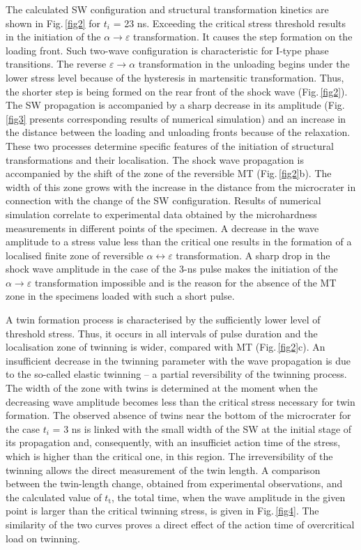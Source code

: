 \documentclass[sw,bibself]{svjour}
\begin{document}
The calculated  SW configuration and structural transformation kinetics
are shown in Fig.\,\ref{fig2} for $t_{i}$ = 23 ns.
Exceeding the critical stress
threshold results in the initiation of
the $\alpha \rightarrow \varepsilon$ transformation.
It causes the step formation on the loading front. Such two-wave configuration
is characteristic for I-type phase transitions. The reverse
$\varepsilon \rightarrow \alpha$ transformation
in the unloading begins under the lower stress level because of
the hysteresis in martensitic transformation. Thus, the shorter step
is being formed on the rear front of the shock wave (Fig.\,\ref{fig2}).
The SW propagation is accompanied by a sharp decrease in its amplitude
(Fig.\,\ref{fig3} presents corresponding results of numerical
simulation)
and an increase in the distance between the loading and unloading fronts
because of the relaxation. These two processes determine specific features
of the initiation of structural transformations and their localisation.
The shock wave propagation is accompanied by the shift of the zone of
the reversible MT (Fig.\,\ref{fig2}b). The width of this zone grows with
the increase in the distance from the microcrater in connection with
the change of the SW configuration. Results of numerical simulation
correlate to experimental data obtained by the microhardness measurements
in different points of the specimen. A decrease in the wave amplitude to
a stress value less than the critical one results in the formation of a
localised finite zone of reversible
$\alpha \leftrightarrow \varepsilon$
transformation. A sharp drop in the shock wave
amplitude in the case of the 3-ns pulse makes the initiation of the
$\alpha \rightarrow \varepsilon$
transformation impossible and is the reason for the absence of the MT
zone in the specimens loaded with such a short pulse.

A twin formation process is characterised by the sufficiently lower level
of threshold stress. Thus, it occurs in all intervals of pulse duration
and the localisation zone of twinning is wider, compared with
MT (Fig.\,\ref{fig2}c). An insufficient decrease in the twinning
parameter with
the wave propagation is due to the so-called elastic twinning --
a partial reversibility of the twinning process. The width of the zone
with twins is determined at the moment when the decreasing wave
amplitude becomes less than the critical stress necessary for twin formation.
The observed absence of twins near the bottom of the microcrater
for the  case $t_{i}$ = 3 ns is linked with the small width of the SW
at the initial stage of its propagation and, consequently,
with an insufficiet action time of the stress,
which is higher than the critical one, in this region. The
irreversibility
of the twinning allows the direct measurement of the twin length.
A comparison between the twin-length change, obtained from experimental
observations, and the calculated value of $t_{\mathrm{t}}$, the total
time,
when the wave amplitude in the given point is larger than the critical
twinning stress, is given in Fig.\,\ref{fig4}. The similarity of the two
curves
proves
a direct effect of the action time of overcritical load on twinning.
\end{document}
